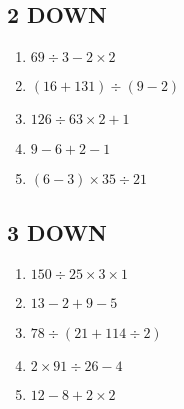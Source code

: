 \documentclass{exam}
\begin{document}
\begin{multicols*}{2}
\subsection*{2 DOWN}
\begin{enumerate}[1)]
\item $69 \div 3 - 2 \times 2$
\item $\left(16 + 131\right) \div \left(9 - 2\right)$
\item $126 \div 63 \times 2 + 1$
\item $9 - 6 + 2 - 1$
\item $\left(6 - 3\right) \times 35 \div 21$
\end{enumerate}
\subsection*{3 DOWN}
\begin{enumerate}[1)]
\item $150 \div 25 \times 3 \times 1$
\item $13 - 2 + 9 - 5$
\item $78 \div \left(21 + 114 \div 2\right)$
\item $2 \times 91 \div 26 - 4$
\item $12 - 8 + 2 \times 2$
\end{enumerate}
\end{multicols*}
\end{document}
